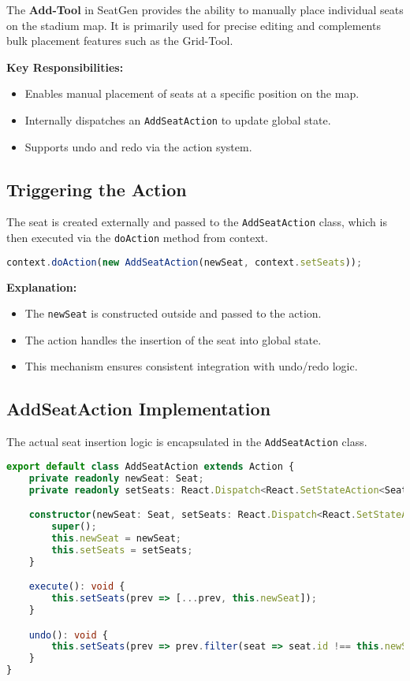 The \textbf{Add-Tool} in SeatGen provides the ability to manually place individual seats on the stadium map. It is primarily used for precise editing and complements bulk placement features such as the Grid-Tool.

\textbf{Key Responsibilities:}
\begin{itemize}
    \item Enables manual placement of seats at a specific position on the map.
    \item Internally dispatches an \texttt{AddSeatAction} to update global state.
    \item Supports undo and redo via the action system.
\end{itemize}

\subsection{Triggering the Action}

The seat is created externally and passed to the \texttt{AddSeatAction} class, which is then executed via the \texttt{doAction} method from context.

\begin{lstlisting}[language=TypeScript, caption=Calling AddSeatAction, label=lst:add-tool-action-call]
context.doAction(new AddSeatAction(newSeat, context.setSeats));
\end{lstlisting}

\textbf{Explanation:}
\begin{itemize}
    \item The \texttt{newSeat} is constructed outside and passed to the action.
    \item The action handles the insertion of the seat into global state.
    \item This mechanism ensures consistent integration with undo/redo logic.
\end{itemize}

\subsection{AddSeatAction Implementation}

The actual seat insertion logic is encapsulated in the \texttt{AddSeatAction} class.

\begin{lstlisting}[language=TypeScript, caption=AddSeatAction Implementation, label=lst:add-seat-action]
export default class AddSeatAction extends Action {
    private readonly newSeat: Seat;
    private readonly setSeats: React.Dispatch<React.SetStateAction<Seat[]>>;

    constructor(newSeat: Seat, setSeats: React.Dispatch<React.SetStateAction<Seat[]>>) {
        super();
        this.newSeat = newSeat;
        this.setSeats = setSeats;
    }

    execute(): void {
        this.setSeats(prev => [...prev, this.newSeat]);
    }

    undo(): void {
        this.setSeats(prev => prev.filter(seat => seat.id !== this.newSeat.id));
    }
}
\end{lstlisting}

